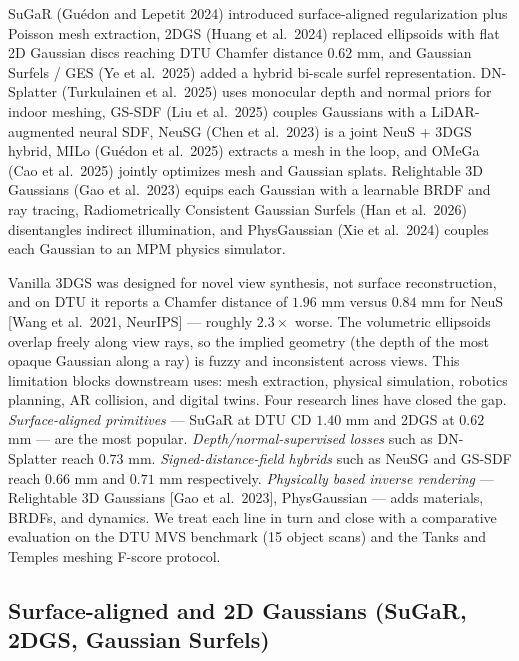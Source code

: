\documentclass{article}
\begin{document}
SuGaR (Guédon and Lepetit 2024) introduced surface-aligned regularization plus Poisson mesh extraction, 2DGS (Huang et al.~2024) replaced ellipsoids with flat 2D Gaussian discs reaching DTU Chamfer distance \(0.62\) mm, and Gaussian Surfels / GES (Ye et al.~2025) added a hybrid bi-scale surfel representation. DN-Splatter (Turkulainen et al.~2025) uses monocular depth and normal priors for indoor meshing, GS-SDF (Liu et al.~2025) couples Gaussians with a LiDAR-augmented neural SDF, NeuSG (Chen et al.~2023) is a joint NeuS + 3DGS hybrid, MILo (Guédon et al.~2025) extracts a mesh in the loop, and OMeGa (Cao et al.~2025) jointly optimizes mesh and Gaussian splats. Relightable 3D Gaussians (Gao et al.~2023) equips each Gaussian with a learnable BRDF and ray tracing, Radiometrically Consistent Gaussian Surfels (Han et al.~2026) disentangles indirect illumination, and PhysGaussian (Xie et al.~2024) couples each Gaussian to an MPM physics simulator.

Vanilla 3DGS was designed for novel view synthesis, not surface reconstruction, and on DTU it reports a Chamfer distance of \(1.96\) mm versus \(0.84\) mm for NeuS {[}Wang et al.~2021, NeurIPS{]} --- roughly \(2.3\times\) worse. The volumetric ellipsoids overlap freely along view rays, so the implied geometry (the depth of the most opaque Gaussian along a ray) is fuzzy and inconsistent across views. This limitation blocks downstream uses: mesh extraction, physical simulation, robotics planning, AR collision, and digital twins. Four research lines have closed the gap. \emph{Surface-aligned primitives} --- SuGaR \cite{gudon2024sugarsurfacealigne} at DTU CD \(1.40\) mm and 2DGS \cite{huang20242dgaussiansplattin} at \(0.62\) mm --- are the most popular. \emph{Depth/normal-supervised losses} such as DN-Splatter \cite{turkulainen2025dnsplatterdepthand} reach \(0.73\) mm. \emph{Signed-distance-field hybrids} such as NeuSG \cite{chen2023neusgneuralimplici} and GS-SDF \cite{liu2025asurveyof3dreconst} reach \(0.66\) mm and \(0.71\) mm respectively. \emph{Physically based inverse rendering} --- Relightable 3D Gaussians {[}Gao et al.~2023{]}, PhysGaussian \cite{xie2024physgaussianphysic} --- adds materials, BRDFs, and dynamics. We treat each line in turn and close with a comparative evaluation on the DTU MVS benchmark (15 object scans) and the Tanks and Temples meshing F-score protocol.

\subsection{Surface-aligned and 2D Gaussians (SuGaR, 2DGS, Gaussian Surfels)}\label{surface-aligned-and-2d-gaussians-sugar-2dgs-gaussian-surfels}
\end{document}
